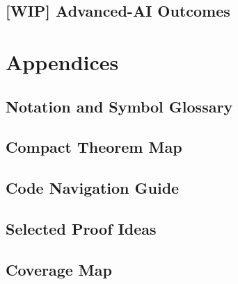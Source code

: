\documentclass[11pt,openany]{report}
\begin{document}

\chapter{[WIP] Advanced-AI Outcomes}
\label{ch:ai-outcomes}



\part{Appendices}
\label{part:appendices}

\chapter{Notation and Symbol Glossary}
\label{ch:notation}
\chapter{Compact Theorem Map}
\label{ch:theorem-map}
\chapter{Code Navigation Guide}
\label{ch:code-nav}
\chapter{Selected Proof Ideas}
\label{ch:proof-ideas}
\chapter{Coverage Map}
\label{ch:coverage-map}



\end{document}
